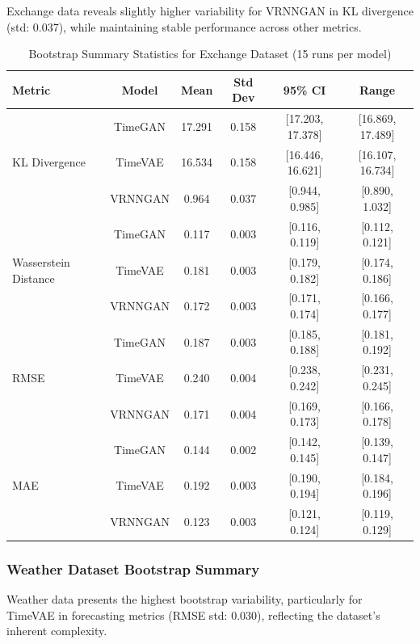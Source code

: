 \documentclass{article}
\begin{document}
Exchange data reveals slightly higher variability for VRNNGAN in KL divergence (std: 0.037), while maintaining stable performance across other metrics.
\begin{table}[H]
    \centering
\caption{Bootstrap Summary Statistics for Exchange Dataset (15 runs per model)}
\label{tab:bootstrap_exchange}
\small
\begin{tabular}{lccccc}
\toprule
\textbf{Metric} & \textbf{Model} & \textbf{Mean} & \textbf{Std Dev} & \textbf{95\% CI} & \textbf{Range} \\
\midrule
\multirow{3}{*}{KL Divergence} 
    & TimeGAN   & 17.291 & 0.158 & [17.203, 17.378] & [16.869, 17.489] \\
    & TimeVAE   & 16.534 & 0.158 & [16.446, 16.621] & [16.107, 16.734] \\
    & VRNNGAN   & 0.964  & 0.037 & [0.944, 0.985]   & [0.890, 1.032] \\
\midrule
\multirow{3}{*}{Wasserstein Distance} 
    & TimeGAN   & 0.117 & 0.003 & [0.116, 0.119] & [0.112, 0.121] \\
    & TimeVAE   & 0.181 & 0.003 & [0.179, 0.182] & [0.174, 0.186] \\
    & VRNNGAN   & 0.172 & 0.003 & [0.171, 0.174] & [0.166, 0.177] \\
\midrule
\multirow{3}{*}{RMSE} 
    & TimeGAN   & 0.187 & 0.003 & [0.185, 0.188] & [0.181, 0.192] \\
    & TimeVAE   & 0.240 & 0.004 & [0.238, 0.242] & [0.231, 0.245] \\
    & VRNNGAN   & 0.171 & 0.004 & [0.169, 0.173] & [0.166, 0.178] \\
\midrule
\multirow{3}{*}{MAE} 
    & TimeGAN   & 0.144 & 0.002 & [0.142, 0.145] & [0.139, 0.147] \\
    & TimeVAE   & 0.192 & 0.003 & [0.190, 0.194] & [0.184, 0.196] \\
    & VRNNGAN   & 0.123 & 0.003 & [0.121, 0.124] & [0.119, 0.129] \\
\bottomrule
\end{tabular}
\end{table}

\subsubsection{Weather Dataset Bootstrap Summary}

Weather data presents the highest bootstrap variability, particularly for TimeVAE in forecasting metrics (RMSE std: 0.030), reflecting the dataset's inherent complexity.
\end{document}
